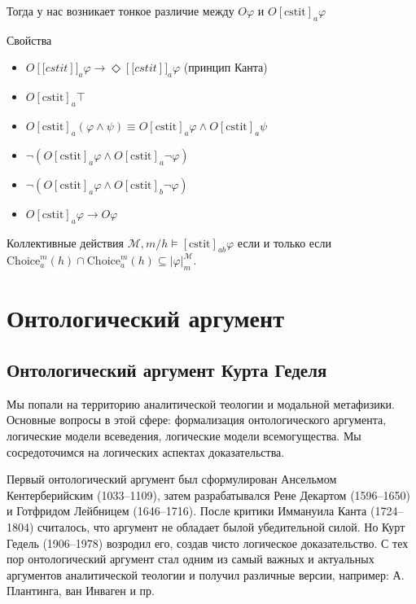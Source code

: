 \documentclass[openany]{book}
\theoremstyle{plain}
\theoremstyle{definition}
\begin{document}
Тогда у нас возникает тонкое различие между \(O \varphi\) и \(O [\mathrm{cstit}]_a \varphi\)

Свойства
\begin{itemize}
    \item \(O [\mathrm[cstit]]_a \varphi \to \Diamond [\mathrm[cstit]]_a \varphi\) (принцип Канта)
    \item \(O [\mathrm{cstit}]_a \top\) 
    \item \(O [\mathrm{cstit}]_a (\varphi \land \psi) \equiv O [\mathrm{cstit}]_a \varphi \land O [\mathrm{cstit}]_a \psi\)
    \item \(\neg (O [\mathrm{cstit}]_a \varphi \land O [\mathrm{cstit}]_a \neg \varphi)\)
    \item \(\neg (O [\mathrm{cstit}]_a \varphi \land O [\mathrm{cstit}]_b \neg \varphi)\)
    \item \(O [\mathrm{cstit}]_a \varphi \to O \varphi\)
\end{itemize}

Коллективные действия \(\mathcal{M}, m/h \models [\mathrm{cstit}]_{ab} \varphi\) если и только если \(\mathrm{Choice}_a^m (h) \cap \mathrm{Choice}_a^m (h) \subseteq |\varphi|_m^{\mathcal{M}}\).


\chapter{Онтологический аргумент}

\section{Онтологический аргумент Курта Геделя}

Мы попали на территорию аналитической теологии и модальной метафизики. Основные вопросы в этой сфере: формализация онтологического аргумента, логические модели всеведения, логические модели всемогущества.
Мы сосредоточимся на логических аспектах доказательства.

Первый онтологический аргумент был сформулирован Ансельмом Кентерберийским (1033--1109), затем разрабатывался Рене Декартом (1596--1650) и Готфридом Лейбницем (1646--1716). После критики Иммануила Канта (1724--1804) считалось, что аргумент не обладает былой убедительной силой. Но Курт Гедель (1906--1978) возродил его, создав чисто логическое доказательство. С тех пор онтологический аргумент стал одним из самый важных и актуальных аргументов аналитической теологии и получил различные версии, например: А. Плантинга, ван Инваген и пр.
\end{document}
